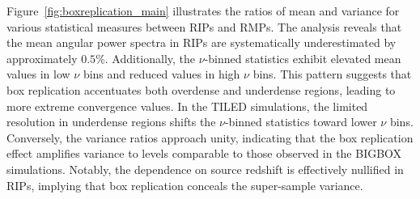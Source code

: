 Figure~\ref{fig:boxreplication_main} illustrates the ratios of mean and variance for various statistical measures between RIPs and RMPs. The analysis reveals that the mean angular power spectra in RIPs are systematically underestimated by approximately $0.5\%$. Additionally, the $\nu$-binned statistics exhibit elevated mean values in low $\nu$ bins and reduced values in high $\nu$ bins. This pattern suggests that box replication accentuates both overdense and underdense regions, leading to more extreme convergence values. In the TILED simulations, the limited resolution in underdense regions shifts the $\nu$-binned statistics toward lower $\nu$ bins. Conversely, the variance ratios approach unity, indicating that the box replication effect amplifies variance to levels comparable to those observed in the BIGBOX simulations. Notably, the dependence on source redshift is effectively nullified in RIPs, implying that box replication conceals the super-sample variance.

